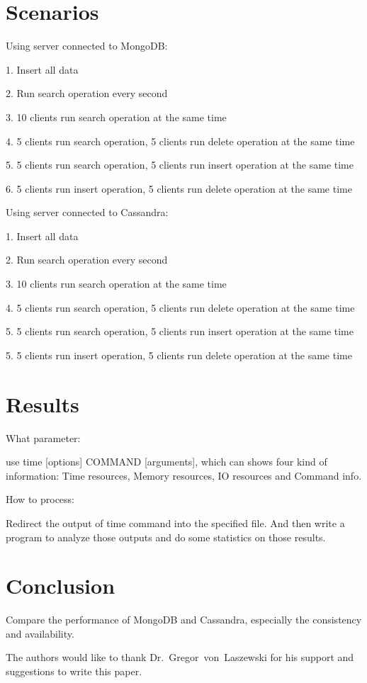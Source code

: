 \section{Scenarios}

Using server connected to MongoDB:

1. Insert all data

2. Run search operation every second

3. 10 clients run search operation at the same time

4. 5 clients run search operation, 5 clients run delete operation at the same time

5. 5 clients run search operation, 5 clients run insert operation at the same time

6. 5 clients run insert operation, 5 clients run delete operation at the same time


Using server connected to Cassandra:

1. Insert all data

2. Run search operation every second

3. 10 clients run search operation at the same time

4. 5 clients run search operation, 5 clients run delete operation at the same time

5. 5 clients run search operation, 5 clients run insert operation at the same time

5. 5 clients run insert operation, 5 clients run delete operation at the same time


\section{Results}
What parameter:

use time [options] COMMAND [arguments], which can shows four kind of information:
 Time resources, Memory resources, IO resources and Command info.

How to process:

Redirect the output of time command into the specified file. And then write a 
program to analyze those outputs and do some statistics on those results. 


\section{Conclusion}
Compare the performance of MongoDB and Cassandra, especially the consistency 
and availability.

\begin{acks}

  The authors would like to thank Dr.~Gregor~von~Laszewski for his
  support and suggestions to write this paper.

\end{acks}


 

